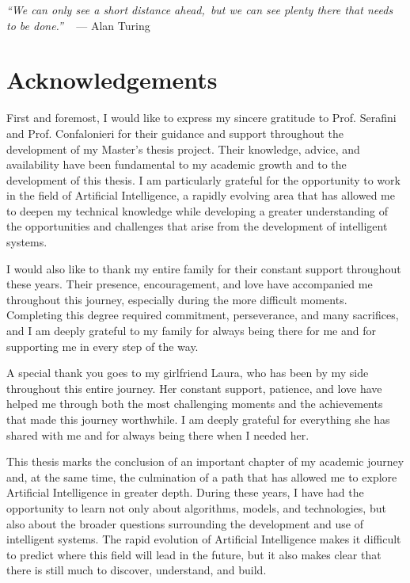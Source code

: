\cleardoublepage
{}
{}

\begin{flushright}{
\slshape
``We can only see a short distance ahead,\
but we can see plenty there that needs to be done.''} \
\medskip
--- Alan Turing
\end{flushright}

\begingroup
\let\clearpage\relax
\let\cleardoublepage\relax

\chapter*{Acknowledgements}

\noindent First and foremost, I would like to express my sincere gratitude to Prof. Serafini and Prof. Confalonieri for their guidance and support throughout the development of my Master’s thesis project. Their knowledge, advice, and availability have been fundamental to my academic growth and to the development of this thesis. I am particularly grateful for the opportunity to work in the field of Artificial Intelligence, a rapidly evolving area that has allowed me to deepen my technical knowledge while developing a greater understanding of the opportunities and challenges that arise from the development of intelligent systems.

\vspace{0.35cm}

\noindent I would also like to thank my entire family for their constant support throughout these years. Their presence, encouragement, and love have accompanied me throughout this journey, especially during the more difficult moments. Completing this degree required commitment, perseverance, and many sacrifices, and I am deeply grateful to my family for always being there for me and for supporting me in every step of the way.

\vspace{0.35cm}

\noindent A special thank you goes to my girlfriend Laura, who has been by my side throughout this entire journey. Her constant support, patience, and love have helped me through both the most challenging moments and the achievements that made this journey worthwhile. I am deeply grateful for everything she has shared with me and for always being there when I needed her.

\vspace{0.35cm}

\noindent This thesis marks the conclusion of an important chapter of my academic journey and, at the same time, the culmination of a path that has allowed me to explore Artificial Intelligence in greater depth. During these years, I have had the opportunity to learn not only about algorithms, models, and technologies, but also about the broader questions surrounding the development and use of intelligent systems. The rapid evolution of Artificial Intelligence makes it difficult to predict where this field will lead in the future, but it also makes clear that there is still much to discover, understand, and build.


